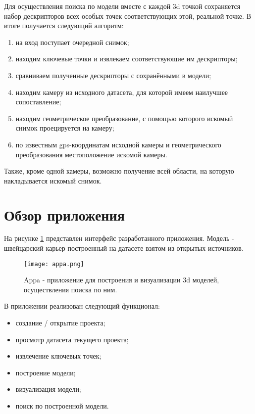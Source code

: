 Для осуществления поиска по модели вместе с каждой 3d точкой сохраняется набор дескрипторов всех особых точек соответствующих этой, реальной точке. В итоге получается следующий алгоритм:

\begin{enumerate}
    \item на вход поступает очередной снимок;
    \item находим ключевые точки и извлекаем соответствующие им дескрипторы;
    \item сравниваем полученные дескрипторы с сохранёнными в модели;
    \item находим камеру из исходного датасета, для которой имеем наилучшее сопоставление;
    \item находим геометрическое преобразование, с помощью которого искомый снимок проецируется на  камеру;
    \item по известным gps-координатам исходной камеры и геометрического преобразования местоположение искомой камеры.
\end{enumerate}

Также, кроме одной камеры, возможно получение всей области, на которую накладывается искомый снимок.

\section{Обзор приложения}

На рисунке \ref{fig:appa} представлен интерфейс разработанного приложения. Модель - швейцарский карьер построенный на датасете взятом из открытых источников.

\begin{figure}[h]
    \centering
    \texttt{[image: appa.png]}
    \caption{Appa - приложение для построения и визуализации 3d моделей, осуществления поиска по ним.}
    \label{fig:appa}
\end{figure}

В приложении реализован следующий функционал:

\begin{itemize}
    \item создание / открытие проекта;
    \item просмотр датасета текущего проекта;
    \item извлечение ключевых точек;
    \item построение модели;
    \item визуализация модели;
    \item поиск по построенной модели.
\end{itemize}

